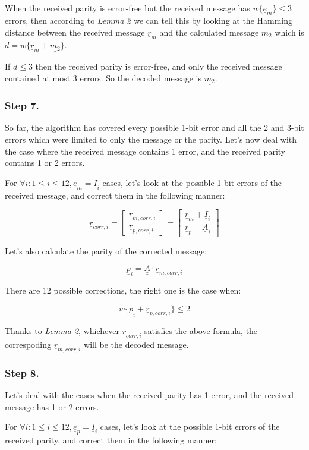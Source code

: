 \documentclass[11pt,a4paper,oneside]{report}             %
\def\doubleunderline#1{\underline{\underline{#1}}}
\def\dul#1{\doubleunderline{#1}}
\def\ul#1{\underline{#1}}
\newcommand{\vect}[2]{\begin{bmatrix} #1 \\ #2 \end{bmatrix}}
\begin{document}
When the received parity is error-free but the received message has $w\{\ul{e}_m\} \leq 3$ errors, then according to
\emph{Lemma 2} we can tell this by looking at the Hamming distance between the received message $\ul{r}_m$
and the calculated message $\ul{m_2}$ which is $d = w\{\ul{r}_m + \ul{m_2}\}$.

If $d \leq 3$ then the received parity is error-free, and only the received message contained at most 3 errors.
So the decoded message is $\ul{m_2}$.

\subsubsection{Step 7.}

So far, the algorithm has covered every possible 1-bit error and all the 2 and 3-bit errors which were
limited to only the message or the parity. Let's now deal with the case where the received message contains 1 error,
and the received parity contains 1 or 2 errors.

For $\forall i : 1 \leq i \leq 12, \ul{e}_m = \ul{I}_i$ cases, let's look at the possible 1-bit errors of the
received message, and correct them in the following manner:

\[
    \ul{r}_{corr, i} = \vect{\ul{r}_{m, corr, i}}{\ul{r}_{p, corr, i}} = \vect{\ul{r}_m + \ul{I}_i}{\ul{r}_p + \ul{A}_i}
\]

Let's also calculate the parity of the corrected message:

\[
    \ul{p}_{i} = \dul{A} \cdot \ul{r}_{m, corr, i}
\]

There are 12 possible corrections, the right one is the case when:

\[
    w\{\ul{p}_{i} + \ul{r}_{p, corr, i}\} \leq 2
\]

Thanks to \emph{Lemma 2}, whichever $\ul{r}_{corr, i}$ satisfies the above formula, the correspoding $\ul{r}_{m, corr, i}$ will be
the decoded message.

\subsubsection{Step 8.}

Let's deal with the cases when the received parity has 1 error, and the received message has 1 or 2 errors.

For $\forall i : 1 \leq i \leq 12, \ul{e}_p = \ul{I}_i$ cases, let's look at the possible 1-bit errors of the
received parity, and correct them in the following manner:
\end{document}
